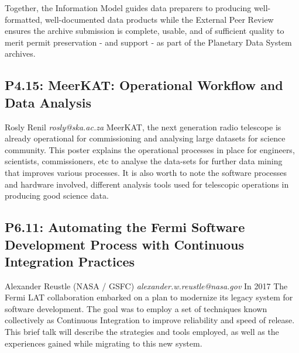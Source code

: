 \documentclass{report}
\begin{document}
Together, the Information Model guides data preparers to producing well-formatted, well-documented data products while the External Peer Review ensures the archive submission is complete, usable, and of sufficient quality to merit permit preservation - and support - as part of the Planetary Data System archives.\newline
\newpage
\subsection*{P4.15: MeerKAT: Operational Workflow and Data Analysis}
\bigskip
Rosly Renil  \newline   \newline   \newline   \newline  \newline  \newline\newline
{\it rosly@ska.ac.za}\newline
\newline\newline
MeerKAT, the next generation radio telescope is already operational for commissioning and analysing large datasets for science community. This poster explains the operational processes in place for engineers, scientists, commissioners, etc to analyse the data-sets for further data mining that improves various processes. It is also worth to note the software processes and hardware involved, different analysis tools used for telescopic operations in producing good science data.\newline
\newpage
\subsection*{P6.11: Automating the Fermi Software Development Process with Continuous Integration Practices}
\bigskip
Alexander Reustle (NASA / GSFC) \newline   \newline   \newline   \newline  \newline  \newline\newline
{\it alexander.w.reustle@nasa.gov}\newline
\newline\newline
In 2017 The Fermi LAT collaboration embarked on a plan to modernize its legacy system for software development. The goal was to employ a set of techniques known collectively as Continuous Integration to improve reliability and speed of release. This brief talk will describe the strategies and tools employed, as well as the experiences gained while migrating to this new system.\newline
\newpage
\end{document}
